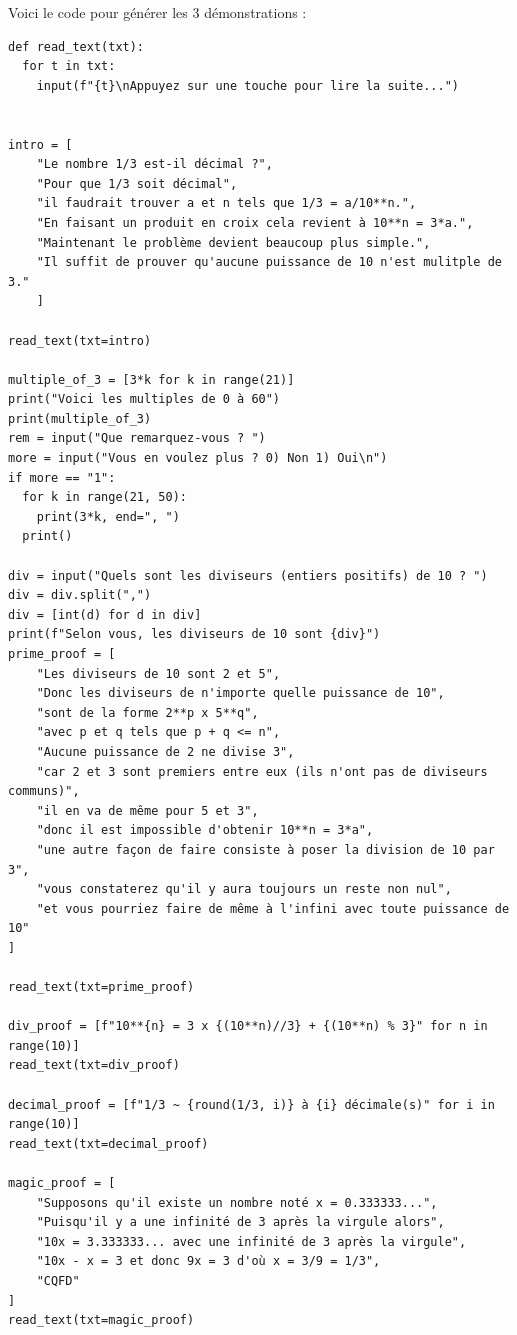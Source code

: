 \documentclass[a4paper, 11pt, twoside]{book}
\begin{document}
Voici le code pour générer les 3 démonstrations :
\begin{verbatim}
def read_text(txt):
  for t in txt:
    input(f"{t}\nAppuyez sur une touche pour lire la suite...")


intro = [
    "Le nombre 1/3 est-il décimal ?",
    "Pour que 1/3 soit décimal",
    "il faudrait trouver a et n tels que 1/3 = a/10**n.",
    "En faisant un produit en croix cela revient à 10**n = 3*a.",
    "Maintenant le problème devient beaucoup plus simple.",
    "Il suffit de prouver qu'aucune puissance de 10 n'est mulitple de 3."
    ]

read_text(txt=intro)

multiple_of_3 = [3*k for k in range(21)]
print("Voici les multiples de 0 à 60")
print(multiple_of_3)
rem = input("Que remarquez-vous ? ")
more = input("Vous en voulez plus ? 0) Non 1) Oui\n")
if more == "1":
  for k in range(21, 50):
    print(3*k, end=", ")
  print()

div = input("Quels sont les diviseurs (entiers positifs) de 10 ? ")
div = div.split(",")
div = [int(d) for d in div]
print(f"Selon vous, les diviseurs de 10 sont {div}")
prime_proof = [
    "Les diviseurs de 10 sont 2 et 5",
    "Donc les diviseurs de n'importe quelle puissance de 10",
    "sont de la forme 2**p x 5**q",
    "avec p et q tels que p + q <= n",
    "Aucune puissance de 2 ne divise 3",
    "car 2 et 3 sont premiers entre eux (ils n'ont pas de diviseurs communs)",
    "il en va de même pour 5 et 3",
    "donc il est impossible d'obtenir 10**n = 3*a",
    "une autre façon de faire consiste à poser la division de 10 par 3",
    "vous constaterez qu'il y aura toujours un reste non nul",
    "et vous pourriez faire de même à l'infini avec toute puissance de 10"
]

read_text(txt=prime_proof)

div_proof = [f"10**{n} = 3 x {(10**n)//3} + {(10**n) % 3}" for n in range(10)]
read_text(txt=div_proof)

decimal_proof = [f"1/3 ~ {round(1/3, i)} à {i} décimale(s)" for i in range(10)]
read_text(txt=decimal_proof)

magic_proof = [
    "Supposons qu'il existe un nombre noté x = 0.333333...",
    "Puisqu'il y a une infinité de 3 après la virgule alors",
    "10x = 3.333333... avec une infinité de 3 après la virgule",
    "10x - x = 3 et donc 9x = 3 d'où x = 3/9 = 1/3",
    "CQFD"
]
read_text(txt=magic_proof)
\end{verbatim}
\stopcontents[level-2]
\stopcontents[level-1]
\end{document}
